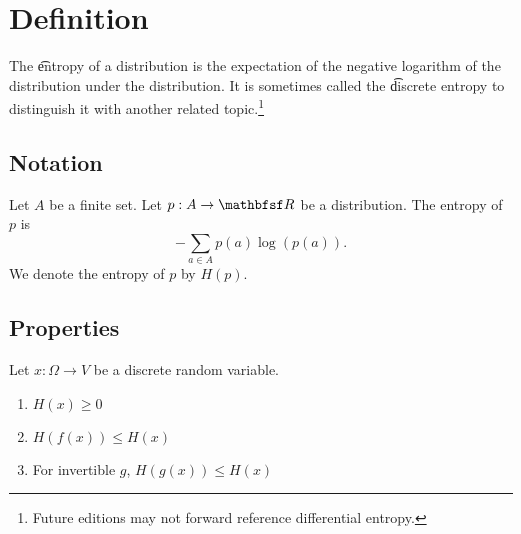 

\section*{Definition}

The \t{entropy} of a distribution is the expectation of the negative logarithm of the distribution under the distribution.
It is sometimes called the \t{discrete entropy} to distinguish it with another related topic.\footnote{Future editions may not forward reference differential entropy.}

\subsection*{Notation}

Let $A$ be a finite set.
Let $p:A \to \R $ be a distribution.
The entropy of $p$ is
\[
-\sum_{a \in A} p(a) \log(p(a)).
\]
We denote the entropy of $p$ by
$H(p)$.

\subsection*{Properties}

Let $x: \Omega  \to V$ be a discrete random variable.
    \begin{enumerate}
      \item $H(x) \geq 0$
      \item $H(f(x)) \leq H(x)$
      \item For invertible $g$, $H(g(x)) \leq H(x)$

    \end{enumerate}

\blankpage